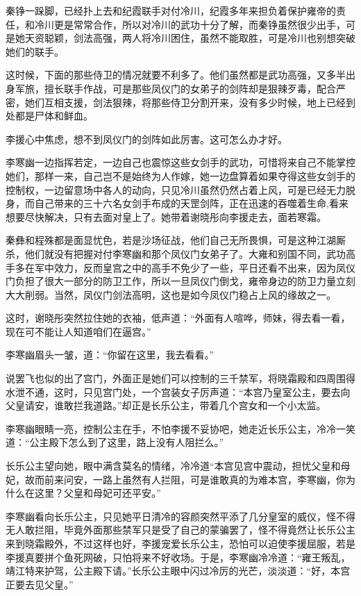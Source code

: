 秦铮一跺脚，已经扑上去和纪霞联手对付冷川，纪霞多年来担负着保护雍帝的责任，和冷川更是常常合作，所以对冷川的武功十分了解，而秦铮虽然很少出手，可是她天资聪颖，剑法高强，两人将冷川困住，虽然不能取胜，可是冷川也别想突破她们的联手。

这时候，下面的那些侍卫的情况就要不利多了。他们虽然都是武功高强，又多半出身军旅，擅长联手作战，可是那些凤仪门的女弟子的剑阵却是狠辣歹毒，配合严密，她们互相支援，剑法狠辣，将那些侍卫分割开来，没有多少时候，地上已经到处都是尸体和鲜血。

李援心中焦虑，想不到凤仪门的剑阵如此厉害。这可怎么办才好。

李寒幽一边指挥若定，一边自己也震惊这些女剑手的武功，可惜将来自己不能掌控她们，那样一来，自己岂不是始终为人作嫁，她一边盘算着如果夺得这些女剑手的控制权，一边留意场中各人的动向，只见冷川虽然仍然占着上风，可是已经无力脱身，而自己带来的三十六名女剑手布成的天罡剑阵，正在迅速的吞噬着生命,看来想要尽快解决，只有去面对皇上了。她带着谢晓彤向李援走去，面若寒霜。

秦彝和程殊都是面显忧色，若是沙场征战，他们自己无所畏惧，可是这种江湖厮杀，他们就没有把握对付李寒幽和那个凤仪门女弟子了。大雍和别国不同，武功高手多在军中效力，反而皇宫之中的高手不免少了一些，平日还看不出来，因为凤仪门负担了很大一部分的防卫工作，所以一旦凤仪门倒戈，雍帝身边的防卫力量立刻大大削弱。当然，凤仪门剑法高明，这也是如今凤仪门稳占上风的缘故之一。

这时，谢晓彤突然拉住她的衣袖，低声道：“外面有人喧哗，师妹，得去看一看，现在可不能让人知道咱们在逼宫。”

李寒幽眉头一皱，道：“你留在这里，我去看看。”

说罢飞也似的出了宫门，外面正是她们可以控制的三千禁军，将晓霜殿和四周围得水泄不通，这时，只见宫门处，一个宫装女子厉声道：“本宫乃皇室公主，要去向父皇请安，谁敢拦我道路。”却正是长乐公主，带着几个宫女和一个小太监。

李寒幽眼睛一亮，控制公主在手，不怕李援不妥协吧，她走近长乐公主，冷冷一笑道：“公主殿下怎么到了这里，路上没有人阻拦么。”

长乐公主望向她，眼中满含莫名的情绪，冷冷道“本宫见宫中震动，担忧父皇和母妃，故而前来问安，一路上虽然有人拦阻，可是谁敢真的为难本宫，李寒幽，你为什么在这里？父皇和母妃可还平安。”

李寒幽看向长乐公主，只见她平日清冷的容颜突然平添了几分皇室的威仪，怪不得无人敢拦阻，毕竟外面那些禁军只是受了自己的蒙骗罢了，怪不得竟然让长乐公主来到晓霜殿外，不过这样也好，李援宠爱长乐公主，恐怕可以迫使李援屈服，若是李援真要拼个鱼死网破，只怕将来不好收场。于是，李寒幽冷冷道：“雍王叛乱，靖江特来护驾，公主殿下请。”长乐公主眼中闪过冷厉的光芒，淡淡道：“好，本宫正要去见父皇。”

